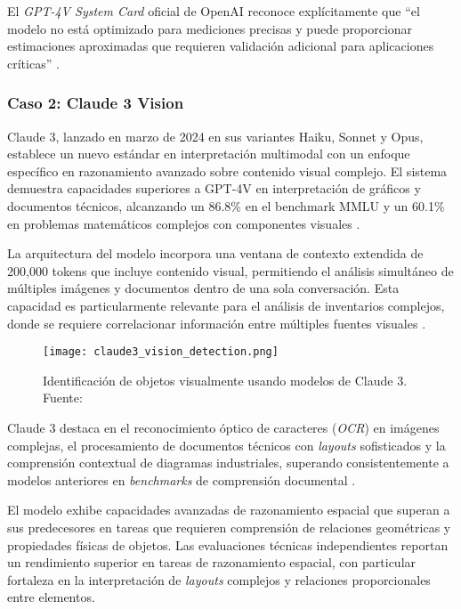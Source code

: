 El \textit{GPT-4V System Card} oficial de OpenAI reconoce explícitamente que “el modelo no está optimizado para mediciones precisas y puede proporcionar estimaciones aproximadas que requieren validación adicional para aplicaciones críticas” \cite{ArticleRef255136}.


\subsubsection{Caso 2: Claude 3 Vision}

Claude 3, lanzado en marzo de 2024 en sus variantes Haiku, Sonnet y Opus, establece un nuevo estándar en interpretación multimodal con un enfoque específico en razonamiento avanzado sobre contenido visual complejo. El sistema demuestra capacidades superiores a GPT-4V en interpretación de gráficos y documentos técnicos, alcanzando un 86.8\% en el benchmark MMLU y un 60.1\% en problemas matemáticos complejos con componentes visuales \cite{Anthropic2024}.

La arquitectura del modelo incorpora una ventana de contexto extendida de 200{,}000 tokens que incluye contenido visual, permitiendo el análisis simultáneo de múltiples imágenes y documentos dentro de una sola conversación. Esta capacidad es particularmente relevante para el análisis de inventarios complejos, donde se requiere correlacionar información entre múltiples fuentes visuales \cite{WebRef13251}.

\begin{figure}[H]
    \centering
    \texttt{[image: claude3\_vision\_detection.png]}
    \caption{Identificación de objetos visualmente usando modelos de Claude 3. Fuente: \cite{Anthropic2024}}
    \label{fig:claude3_detection}
\end{figure}

Claude 3 destaca en el reconocimiento óptico de caracteres (\textit{OCR}) en imágenes complejas, el procesamiento de documentos técnicos con \textit{layouts} sofisticados y la comprensión contextual de diagramas industriales, superando consistentemente a modelos anteriores en \textit{benchmarks} de comprensión documental \cite{Anthropic2024}.

El modelo exhibe capacidades avanzadas de razonamiento espacial que superan a sus predecesores en tareas que requieren comprensión de relaciones geométricas y propiedades físicas de objetos. Las evaluaciones técnicas independientes reportan un rendimiento superior en tareas de razonamiento espacial, con particular fortaleza en la interpretación de \textit{layouts} complejos y relaciones proporcionales entre elementos.

